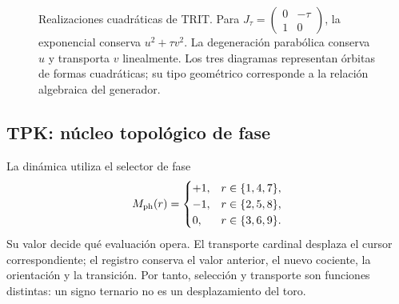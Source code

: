 \begin{figure}[htbp]
\centering
{}
\caption{Realizaciones cuadráticas de TRIT. Para
\(J_\tau=\left(\begin{smallmatrix}0&-\tau\\1&0\end{smallmatrix}\right)\),
la exponencial conserva \(u^2+\tau v^2\). La degeneración parabólica
conserva \(u\) y transporta \(v\) linealmente. Los tres diagramas representan
órbitas de formas cuadráticas; su tipo geométrico corresponde a la relación
algebraica del generador.}
\label{x_reciprocidad:fig:trit-regimenes}
\end{figure}



\newpage
\subsection{TPK: núcleo topológico de fase}

La dinámica utiliza el selector de fase
\[
 M_{\rm ph}(r)=
 \begin{cases}
 +1,&r\in\{1,4,7\},\\
 -1,&r\in\{2,5,8\},\\
 0,&r\in\{3,6,9\}.
 \end{cases}
\]
Su valor decide qué evaluación opera. El transporte cardinal desplaza el cursor correspondiente; el registro conserva el valor anterior, el nuevo cociente, la orientación y la transición. Por tanto, selección y transporte son funciones distintas: un signo ternario no es un desplazamiento del toro.

